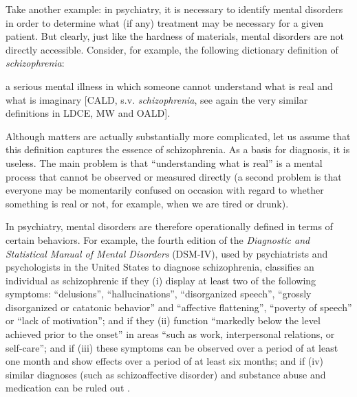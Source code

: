 Take another example: in psychiatry, it is necessary to identify mental disorders in order to determine what (if any) treatment may be necessary for a given patient. But clearly, just like the hardness of materials, mental disorders are not directly accessible. Consider, for example, the following dictionary  definition of \textit{schizophrenia}:

\begin{exe}
\ex a serious mental illness in which someone cannot understand what is real and what is imaginary [CALD, s.v. \textit{schizophrenia}, see again the very similar definitions in LDCE, MW and OALD].
\label{ex:caldschizophrenia}
\end{exe}

Although matters are actually substantially more complicated, let us assume that this definition captures the essence of schizophrenia. As a basis for diagnosis, it is useless. The main problem is that ``understanding what is real'' is a mental process that cannot be observed or measured  directly (a second problem is that everyone may be momentarily confused on occasion with regard to whether something is real or not, for example, when we are tired or drunk).

In psychiatry, mental disorders are therefore operationally  defined in terms of certain behaviors. For example, the fourth edition of the \emph{Diagnostic and Statistical Manual of Mental Disorders} (DSM\hyp{}IV), used by psychiatrists and psychologists  in the United States to diagnose schizophrenia, classifies an individual as schizophrenic if they (i) display at least two of the following symptoms: ``delusions'', ``hallucinations'', ``disorganized speech'', ``grossly disorganized or catatonic behavior'' and ``affective flattening'', ``poverty of speech'' or ``lack of motivation''; and if they (ii) function ``markedly below the level achieved prior to the onset'' in areas ``such as work, interpersonal relations, or self\hyp{}care''; and if (iii) these symptoms can be observed over a period of at least one month and show effects over a period of at least six months; and if (iv) similar diagnoses (such as schizoaffective disorder) and substance abuse and medication can be ruled out \citep{american_psychiatric_association_diagnostic_2000}.

